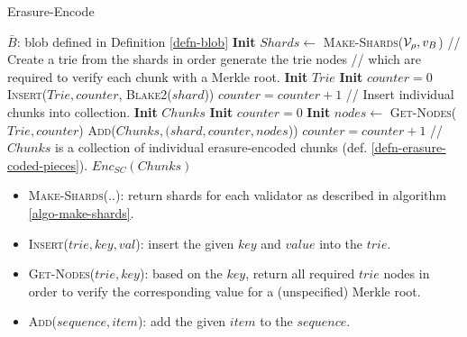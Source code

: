 \begin{algorithm}[H]
  \caption[]{\sc Erasure-Encode}
  \label{algo-erasure-encode}
  \begin{algorithmic}[1]
    \Require
    $\bar{B}$: blob defined in Definition \ref{defn-blob}
    \State \textbf{Init} $Shards \leftarrow$ \textsc{Make-Shards}($\mathcal{V}_\rho, v_B$)
    \Statex
    \Statex // Create a trie from the shards in order generate the trie nodes
    \Statex // which are required to verify each chunk with a Merkle root.
    \State \textbf{Init} $Trie$
    \State \textbf{Init} $counter = 0$
      \State \textsc{Insert}($Trie,counter$, \textsc{Blake2}($shard$))
      \State $counter = counter + 1$
    \EndFor
    \Statex
    \Statex // Insert individual chunks into collection.
    \State \textbf{Init} $Chunks$
    \State \textbf{Init} $counter = 0$
      \State \textbf{Init} $nodes \leftarrow$ \textsc{Get-Nodes}($Trie, counter$)
      \State \textsc{Add}($Chunks, (shard, counter, nodes$))
      \State $counter = counter + 1$
    \EndFor
    \Statex
    \Statex // $Chunks$ is a collection of individual erasure-encoded chunks (def. \ref{defn-erasure-coded-pieces}).
    \State \Return $Enc_{SC}(Chunks)$
  \end{algorithmic}
\end{algorithm}

\begin{itemize}
  \item \textsc{Make-Shards(..)}: return shards for each validator as
  described in algorithm \ref{algo-make-shards}.
  \item \textsc{Insert($trie,key,val$)}: insert the given $key$ and $value$ into the $trie$.
  \item \textsc{Get-Nodes($trie,key$)}: based on the $key$, return all required $trie$ nodes in
  order to verify the corresponding value for a (unspecified) Merkle root.
  \item \textsc{Add($sequence, item$)}: add the given $item$ to the $sequence$.
\end{itemize}

